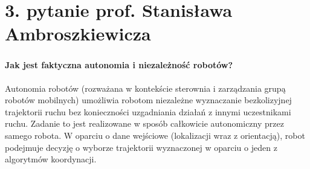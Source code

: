 \section*{3. pytanie prof. Stanisława Ambroszkiewicza}
\begin{frame}
\frametitle{\secname}
\framesubtitle{Jak jest faktyczna autonomia i niezależność robotów?}

Autonomia robotów (rozważana w kontekście sterownia i zarządzania grupą robotów mobilnych) umożliwia robotom niezależne wyznaczanie bezkolizyjnej trajektorii ruchu bez konieczności uzgadniania działań z innymi uczestnikami ruchu. Zadanie to jest realizowane w sposób całkowicie autonomiczny przez samego robota.  W oparciu o dane wejściowe (lokalizacji wraz z orientacją), robot podejmuje decyzję o wyborze trajektorii wyznaczonej w oparciu o jeden z algorytmów koordynacji.

\end{frame}


